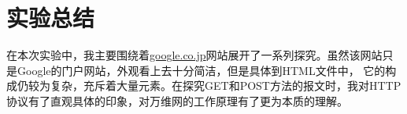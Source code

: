 \section{实验总结}
在本次实验中，我主要围绕着\url{google.co.jp}网站展开了一系列探究。虽然该网站只是Google的门户网站，外观看上去十分简洁，但是具体到HTML文件中，
它的构成仍较为复杂，充斥着大量元素。在探究GET和POST方法的报文时，我对HTTP协议有了直观具体的印象，对万维网的工作原理有了更为本质的理解。